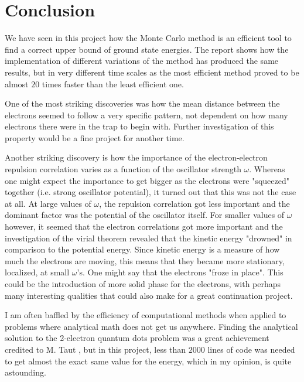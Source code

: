 \section{Conclusion}

We have seen in this project how the Monte Carlo method is an efficient tool to find a correct upper bound of ground state energies. 
The report shows how the implementation of different variations of the method has produced the same results, but in very different time scales as the most efficient method proved to be almost $20$ times faster than the least efficient one. 

One of the most striking discoveries was how the mean distance between the electrons seemed to follow a very specific pattern, not dependent on how many electrons there were in the trap to begin with. 
Further investigation of this property would be a fine project for another time. 


Another striking discovery is how the importance of the electron-electron repulsion correlation varies as a function of the oscillator strength $\omega$. 
Whereas one might expect the importance to get bigger as the electrons were "squeezed" together (i.e. strong oscillator potential), it turned out that this was not the case at all. 
At large values of $\omega$, the repulsion correlation got less important and the dominant factor was the potential of the oscillator itself. 
For smaller values of $\omega$ however, it seemed that the electron correlations got more important and the investigation of the virial theorem revealed that the kinetic energy "drowned" in comparison to the potential energy. 
Since kinetic energy is a measure of how much the electrons are moving, this means that they became more stationary, localized, at small $\omega$'s. 
One might say that the electrons "froze in place".
This could be the introduction of more solid phase for the electrons, with perhaps many interesting qualities that could also make for a great continuation project.

I am often baffled by the efficiency of computational methods when applied to problems where analytical math does not get us anywhere. 
Finding the analytical solution to the 2-electron quantum dots problem was a great achievement credited to M. Taut \cite{Taut}, but in this project, less than $2000$ lines of code was needed to get almost the exact same value for the energy, which in my opinion, is quite astounding.